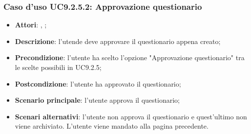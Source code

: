 			\subsubsection{Caso d'uso UC9.2.5.2: Approvazione questionario}
			\label{UC9.2.5.2}
			\begin{itemize}
				\item \textbf{Attori}: \uau, \uaupro;
				\item \textbf{Descrizione}: l'utende deve approvare il questionario appena creato;
				\item \textbf{Precondizione}: l'utente ha scelto l'opzione "Approvazione questionario" tra le scelte possibili in UC9.2.5; 
				\item \textbf{Postcondizione}: l'utente ha approvato il questionario;
				\item \textbf{Scenario principale}: l'utente approva il questionario;
				\item \textbf{Scenari alternativi}: l'utente non approva il questionario e quest'ultimo non viene archiviato. L'utente viene mandato alla pagina precedente.
			\end{itemize}
	 
	
	